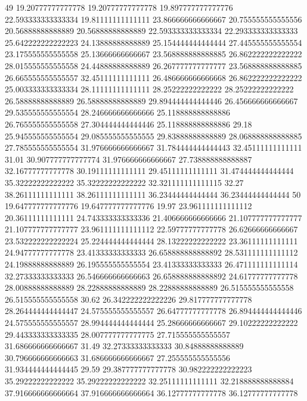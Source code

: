 49 19.20777777777778 19.20777777777778 19.897777777777776 22.593333333333334 19.81111111111111 23.866666666666667 20.755555555555556 20.56888888888889 20.56888888888889 22.593333333333334 22.293333333333333 25.642222222222223 24.13888888888889 25.154444444444444 27.445555555555554 23.175555555555558 25.13666666666667 23.568888888888885 26.862222222222222 28.015555555555558 24.44888888888889 26.267777777777777 23.568888888888885 26.665555555555557 32.45111111111111 26.486666666666668 26.862222222222222 25.003333333333334 28.11111111111111 28.25222222222222 28.25222222222222 26.58888888888889 26.58888888888889 29.894444444444446 26.456666666666667 29.535555555555554 28.246666666666666 25.118888888888886 26.765555555555558 27.304444444444446 25.118888888888886 29.18 25.945555555555554 29.085555555555555 29.83888888888889 28.068888888888885 27.785555555555554 31.976666666666667 31.784444444444443 32.45111111111111 31.01 30.907777777777774 31.976666666666667 27.738888888888887 32.16777777777778 30.19111111111111 29.45111111111111 31.474444444444444 35.32222222222222 35.32222222222222 32.321111111111115 32.27 38.26111111111111 38.26111111111111 36.23444444444444 36.23444444444444
50 19.647777777777776 19.647777777777776 19.97 23.961111111111112 20.36111111111111 24.743333333333336 21.406666666666666 21.107777777777777 21.107777777777777 23.961111111111112 22.59777777777778 26.62666666666667 23.532222222222224 25.224444444444444 28.13222222222222 23.36111111111111 24.94777777777778 23.41333333333333 26.658888888888892 28.531111111111112 24.19888888888889 26.195555555555554 23.41333333333333 26.471111111111114 32.27333333333333 26.546666666666663 26.658888888888892 24.61777777777778 28.00888888888889 28.22888888888889 28.22888888888889 26.515555555555558 26.515555555555558 30.62 26.342222222222226 29.817777777777778 28.264444444444447 24.575555555555557 26.64777777777778 26.894444444444446 24.575555555555557 28.994444444444444 25.28666666666667 29.10222222222222 29.443333333333335 28.007777777777775 27.715555555555557 31.686666666666667 31.49 32.27333333333333 30.84888888888889 30.796666666666663 31.686666666666667 27.255555555555556 31.934444444444445 29.59 29.387777777777778 30.982222222222223 35.29222222222222 35.29222222222222 32.25111111111111 32.218888888888884 37.916666666666664 37.916666666666664 36.12777777777778 36.12777777777778
